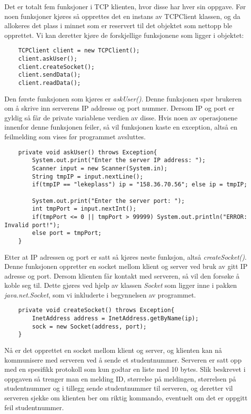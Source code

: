 Det er totalt fem funksjoner i TCP klienten, hvor disse har hver sin oppgave. Før noen funksjoner kjøres så opprettes det en instans av TCPClient klassen, og da allokeres det plass i minnet som er reservert til det objektet som nettopp ble opprettet. Vi kan deretter kjøre de forskjellige funksjonene som ligger i objektet:
\begin{lstlisting}
	TCPClient client = new TCPClient();
	client.askUser();
	client.createSocket();
	client.sendData();
	client.readData();
\end{lstlisting}

Den første funksjonen som kjøres er \textit{askUser()}. Denne funksjonen spør brukeren om å skrive inn serverens IP addresse og port nummer. Dersom IP og port er gyldig så får de private variablene verdien av disse. Hvis noen av operasjonene innenfor denne funksjonen feiler, så vil funksjonen kaste en exception, altså en feilmelding som vises før programmet avsluttes.

\begin{lstlisting}
	private void askUser() throws Exception{
		System.out.print("Enter the server IP address: ");
		Scanner input = new Scanner(System.in);
		String tmpIP = input.nextLine();
		if(tmpIP == "lekeplass") ip = "158.36.70.56"; else ip = tmpIP;

		System.out.print("Enter the server port: ");
		int tmpPort = input.nextInt();
		if(tmpPort <= 0 || tmpPort > 99999) System.out.println("ERROR: Invalid port!");
		else port = tmpPort;
	}
\end{lstlisting}
Etter at IP adressen og port er satt så kjøres neste funksjon, altså \textit{createSocket()}. Denne funksjonen oppretter en socket mellom klient og server ved bruk av gitt IP adresse og port. Dersom klienten får kontakt med serveren, så vil den forsøke å koble seg til. Dette gjøres ved hjelp av klassen \textit{Socket} som ligger inne i pakken \textit{java.net.Socket}, som vi inkluderte i begynnelsen av programmet.
\begin{lstlisting}
	private void createSocket() throws Exception{
		InetAddress address = InetAddress.getByName(ip);
		sock = new Socket(address, port);
	}
\end{lstlisting}

Nå er det opprettet en socket mellom klient og server, og klienten kan nå kommunisere med serveren ved å sende et studentnummer. Serveren er satt opp med en spesifikk protokoll som kun godtar en liste med 10 bytes. Slik beskrevet i oppgaven så trenger man en melding ID, størrelse på meldingen, størrelsen på studentnummer og i tillegg sende studentnummer til serveren, og deretter vil serveren sjekke om klienten ber om riktig kommando, eventuelt om det er oppgitt feil studentnummer.\\

